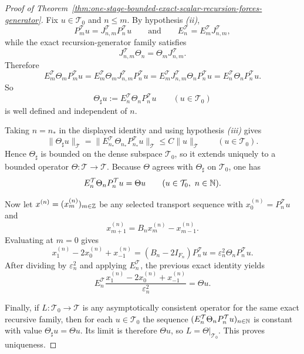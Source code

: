 \begin{proof}[Proof of Theorem~\ref{thm:one-stage-bounded-exact-scalar-recursion-forces-generator}]
\label{proof:thm:one-stage-bounded-exact-scalar-recursion-forces-generator}
Fix \(u\in\mathcal T_0\) and \(n\le m\). By hypothesis \emph{(ii)},
\[
P_m^{\mathcal T}u=J_{n,m}^{\mathcal T}P_n^{\mathcal T}u
\qquad\text{and}\qquad
E_n^{\mathcal T}=E_m^{\mathcal T}J_{n,m}^{\mathcal T},
\]
while the exact recursion-generator family satisfies
\[
J_{n,m}^{\mathcal T}\Theta_n=\Theta_mJ_{n,m}^{\mathcal T}.
\]
Therefore
\[
E_m^{\mathcal T}\Theta_mP_m^{\mathcal T}u
=
E_m^{\mathcal T}\Theta_mJ_{n,m}^{\mathcal T}P_n^{\mathcal T}u
=
E_m^{\mathcal T}J_{n,m}^{\mathcal T}\Theta_nP_n^{\mathcal T}u
=
E_n^{\mathcal T}\Theta_nP_n^{\mathcal T}u.
\]
So
\[
\Theta_\sharp u:=E_n^{\mathcal T}\Theta_nP_n^{\mathcal T}u
\qquad (u\in\mathcal T_0)
\]
is well defined and independent of \(n\).

Taking \(n=n_\ast\) in the displayed identity and using hypothesis
\emph{(iii)} gives
\[
\|\Theta_\sharp u\|_{\mathcal T}
=
\|E_{n_\ast}^{\mathcal T}\Theta_{n_\ast}P_{n_\ast}^{\mathcal T}u\|_{\mathcal T}
\le
C\|u\|_{\mathcal T}
\qquad (u\in\mathcal T_0).
\]
Hence \(\Theta_\sharp\) is bounded on the dense subspace \(\mathcal T_0\), so
it extends uniquely to a bounded operator \(\Theta:\mathcal T\to\mathcal T\).
Because \(\Theta\) agrees with \(\Theta_\sharp\) on \(\mathcal T_0\), one has
\[
E_n^{\mathcal T}\Theta_nP_n^{\mathcal T}u=\Theta u
\qquad (u\in\mathcal T_0,\ n\in\mathbb{N}).
\]

Now let \(x^{(n)}=(x_m^{(n)})_{m\in\mathbb{Z}}\) be any selected transport sequence
with \(x_0^{(n)}=P_n^{\mathcal T}u\) and
\[
x_{m+1}^{(n)}=B_nx_m^{(n)}-x_{m-1}^{(n)}.
\]
Evaluating at \(m=0\) gives
\[
x_1^{(n)}-2x_0^{(n)}+x_{-1}^{(n)}
=(B_n-2I_{F_n})P_n^{\mathcal T}u
=
\varepsilon_n^2\Theta_nP_n^{\mathcal T}u.
\]
After dividing by \(\varepsilon_n^2\) and applying \(E_n^{\mathcal T}\), the
previous exact identity yields
\[
E_n^{\mathcal T}\frac{x_1^{(n)}-2x_0^{(n)}+x_{-1}^{(n)}}{\varepsilon_n^2}
=
\Theta u.
\]

Finally, if \(L:\mathcal T_0\to\mathcal T\) is any asymptotically consistent
operator for the same exact recursive family, then for each \(u\in\mathcal T_0\)
the sequence \((E_n^{\mathcal T}\Theta_nP_n^{\mathcal T}u)_{n\in\mathbb{N}}\) is
constant with value \(\Theta_\sharp u=\Theta u\). Its limit is therefore
\(\Theta u\), so \(L=\Theta|_{\mathcal T_0}\). This proves uniqueness.
\end{proof}

